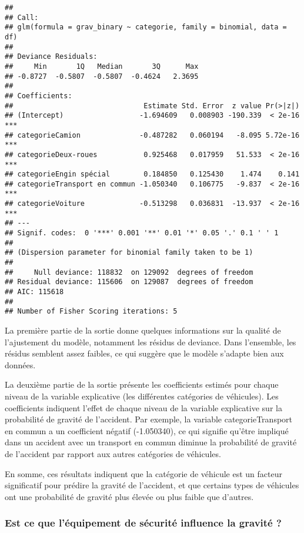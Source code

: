 \documentclass[
]{article}
\begin{document}
\begin{verbatim}
## 
## Call:
## glm(formula = grav_binary ~ categorie, family = binomial, data = df)
## 
## Deviance Residuals: 
##     Min       1Q   Median       3Q      Max  
## -0.8727  -0.5807  -0.5807  -0.4624   2.3695  
## 
## Coefficients:
##                               Estimate Std. Error  z value Pr(>|z|)    
## (Intercept)                  -1.694609   0.008903 -190.339  < 2e-16 ***
## categorieCamion              -0.487282   0.060194   -8.095 5.72e-16 ***
## categorieDeux-roues           0.925468   0.017959   51.533  < 2e-16 ***
## categorieEngin spécial        0.184850   0.125430    1.474    0.141    
## categorieTransport en commun -1.050340   0.106775   -9.837  < 2e-16 ***
## categorieVoiture             -0.513298   0.036831  -13.937  < 2e-16 ***
## ---
## Signif. codes:  0 '***' 0.001 '**' 0.01 '*' 0.05 '.' 0.1 ' ' 1
## 
## (Dispersion parameter for binomial family taken to be 1)
## 
##     Null deviance: 118832  on 129092  degrees of freedom
## Residual deviance: 115606  on 129087  degrees of freedom
## AIC: 115618
## 
## Number of Fisher Scoring iterations: 5
\end{verbatim}

La première partie de la sortie donne quelques informations sur la
qualité de l'ajustement du modèle, notamment les résidus de deviance.
Dans l'ensemble, les résidus semblent assez faibles, ce qui suggère que
le modèle s'adapte bien aux données.

La deuxième partie de la sortie présente les coefficients estimés pour
chaque niveau de la variable explicative (les différentes catégories de
véhicules). Les coefficients indiquent l'effet de chaque niveau de la
variable explicative sur la probabilité de gravité de l'accident. Par
exemple, la variable categorieTransport en commun a un coefficient
négatif (-1.050340), ce qui signifie qu'être impliqué dans un accident
avec un transport en commun diminue la probabilité de gravité de
l'accident par rapport aux autres catégories de véhicules.

En somme, ces résultats indiquent que la catégorie de véhicule est un
facteur significatif pour prédire la gravité de l'accident, et que
certains types de véhicules ont une probabilité de gravité plus élevée
ou plus faible que d'autres.

\hypertarget{est-ce-que-luxe9quipement-de-suxe9curituxe9-influence-la-gravituxe9}{%
\subsubsection{Est ce que l'équipement de sécurité influence la gravité
?}\label{est-ce-que-luxe9quipement-de-suxe9curituxe9-influence-la-gravituxe9}}
\end{document}
